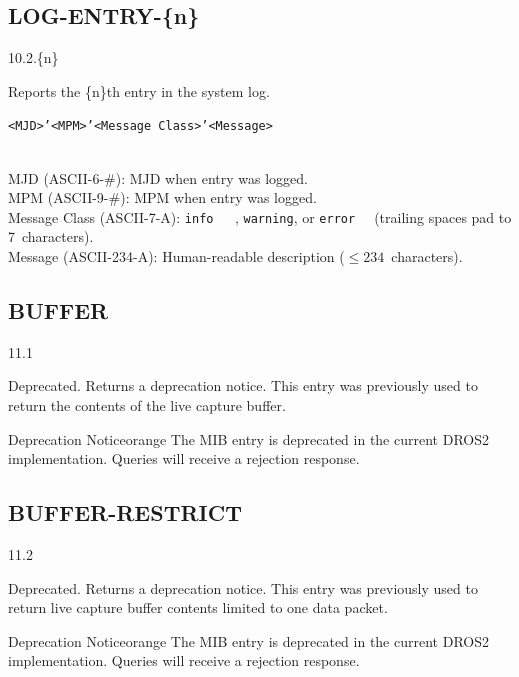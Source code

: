 \subsection{LOG-ENTRY-\{n\}}
\label{mib:log-entry}
\begin{description}[style=nextline]
    \item[Index:] 10.2.\{n\}
    \item[Description:]
        Reports the \{n\}th entry in the system log.
    \item[Response Format:]
        \texttt{<MJD>'<MPM>'<Message Class>'<Message>}
    \item[Response Elements:]~\\
        MJD (ASCII-6-\#): MJD when entry was logged. \\
        MPM (ASCII-9-\#): MPM when entry was logged. \\
        Message Class (ASCII-7-A): \texttt{info~~~}, \texttt{warning}, or
            \texttt{error~~} (trailing spaces pad to 7~characters). \\
        Message (ASCII-234-A): Human-readable description ($\le 234$~characters).
\end{description}

\subsection{BUFFER}
\label{mib:buffer}
\begin{description}[style=nextline]
    \item[Index:] 11.1
    \item[Description:]
        Deprecated.  Returns a deprecation notice.  This entry was previously
        used to return the contents of the live capture buffer.

\begin{calloutBox}{Deprecation Notice}{orange}
The  MIB entry is deprecated in the current DROS2 implementation.
Queries will receive a rejection response.
\end{calloutBox}
\end{description}

\subsection{BUFFER-RESTRICT}
\label{mib:buffer-restrict}
\begin{description}[style=nextline]
    \item[Index:] 11.2
    \item[Description:]
        Deprecated.  Returns a deprecation notice.  This entry was previously
        used to return live capture buffer contents limited to one data packet.

\begin{calloutBox}{Deprecation Notice}{orange}
The  MIB entry is deprecated in the current DROS2 implementation.
Queries will receive a rejection response.
\end{calloutBox}
\end{description}

